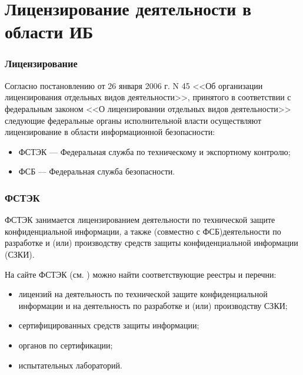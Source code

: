 \section{Лицензирование деятельности в области ИБ}


\begin{frame}
\frametitle{Лицензирование}
Согласно постановлению от 26 января 2006 г. N 45 <<Об организации лицензирования отдельных видов деятельности>>, принятого в соответствии с федеральным законом <<О лицензировании отдельных видов деятельности>> следующие федеральные органы исполнительной власти осуществляют лицензирование в области информационной безопасности:

\begin{itemize}
    \item \alert{ФСТЭК} --- Федеральная служба по техническому и экспортному контролю;
    \item \alert{ФСБ} --- Федеральная служба безопасности.
\end{itemize}
\end{frame}


\begin{frame}
\frametitle{ФСТЭК}
ФСТЭК занимается лицензированием деятельности по технической защите конфиденциальной информации, а также (совместно с ФСБ)деятельности по разработке и (или) производству средств защиты конфиденциальной информации (СЗКИ).

На сайте ФСТЭК (см. \cite{bib:fstec}) можно найти соответствующие реестры и перечни:
\begin{itemize}
    \item лицензий на деятельность по технической защите конфиденциальной информации и на деятельность по разработке и (или) производству СЗКИ;
    \item сертифицированных средств защиты информации;
    \item органов по сертификации;
    \item испытательных лабораторий.
\end{itemize}
\end{frame}


